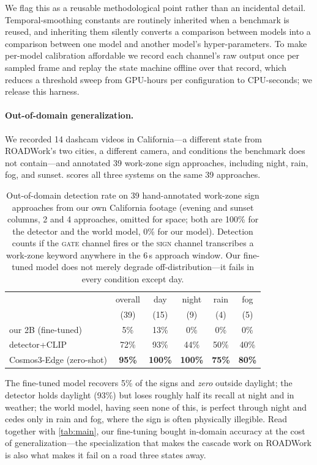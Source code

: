 We flag this as a reusable methodological point rather than an incidental detail.  Temporal-smoothing constants are routinely inherited when a benchmark is reused, and inheriting them silently converts a comparison between models into a comparison between one model and another model's hyper-parameters.  To make per-model calibration affordable we record each channel's raw output once per sampled frame and replay the state machine offline over that record, which reduces a threshold sweep from GPU-hours per configuration to CPU-seconds; we release this harness.

\paragraph{Out-of-domain generalization.}  We recorded 14 dashcam videos in California---a different state from ROADWork's two cities, a different camera, and conditions the benchmark does not contain---and annotated 39 work-zone sign approaches, including night, rain, fog, and sunset.   scores all three systems on the same 39 approaches.

\begin{table}[t]
\centering
\small
\begin{tabular}{lccccc}
\toprule
& overall & day & night & rain & fog \\
& (39) & (15) & (9) & (4) & (5) \\
\midrule
our 2B (fine-tuned) & 5\% & 13\% & 0\% & 0\% & 0\% \\
detector+CLIP & 72\% & 93\% & 44\% & 50\% & 40\% \\
Cosmos3-Edge (zero-shot) & \textbf{95\%} & \textbf{100\%} & \textbf{100\%} & \textbf{75\%} & \textbf{80\%} \\
\bottomrule
\end{tabular}
\caption{Out-of-domain detection rate on 39 hand-annotated work-zone sign approaches from our own California footage (evening and sunset columns, 2 and 4 approaches, omitted for space; both are 100\% for the detector and the world model, 0\% for our model).  Detection counts if the \textsc{gate} channel fires or the \textsc{sign} channel transcribes a work-zone keyword anywhere in the 6\,s approach window.  Our fine-tuned model does not merely degrade off-distribution---it fails in every condition except day.}
\label{tab:ood}
\end{table}

The fine-tuned model recovers 5\% of the signs and \emph{zero} outside daylight; the detector holds daylight (93\%) but loses roughly half its recall at night and in weather; the world model, having seen none of this, is perfect through night and cedes only in rain and fog, where the sign is often physically illegible.  Read together with \cref{tab:main}, our fine-tuning bought in-domain accuracy at the cost of generalization---the specialization that makes the cascade work on ROADWork is also what makes it fail on a road three states away.

